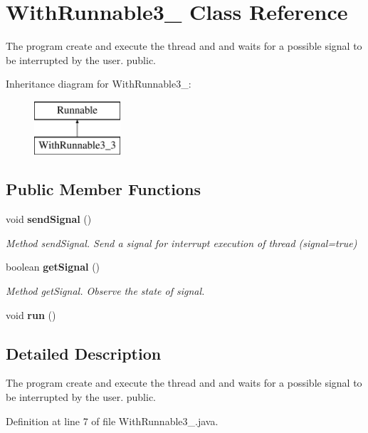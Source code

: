 \section{With\+Runnable3\+\_ Class Reference}
\label{class_with_runnable3__3}


The program create and execute the thread and and waits for a possible signal to be interrupted by the user.  public.  


Inheritance diagram for With\+Runnable3\+\_\+:\begin{figure}[H]
\begin{center}
\leavevmode
\includegraphics[height=2.000000cm]{class_with_runnable3__3}
\end{center}
\end{figure}
\subsection*{Public Member Functions}
\begin{DoxyCompactItemize}
\item 
void {\bf send\+Signal} ()
\begin{DoxyCompactList}\small\item\em Method send\+Signal. Send a signal for interrupt execution of thread (signal=true) \end{DoxyCompactList}\item 
boolean {\bf get\+Signal} ()
\begin{DoxyCompactList}\small\item\em Method get\+Signal. Observe the state of signal. \end{DoxyCompactList}\item 
void {\bf run} ()
\end{DoxyCompactItemize}


\subsection{Detailed Description}
The program create and execute the thread and and waits for a possible signal to be interrupted by the user.  public. 

Definition at line 7 of file With\+Runnable3\+\_.\+java.



